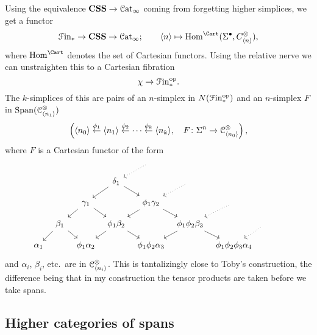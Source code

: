 \documentclass[main.tex]{subfiles}
\begin{document}
Using the equivalence $\mathbf{CSS} \to \mathcal{C}\mathrm{at}_{\infty}$ coming from forgetting higher simplices, we get a functor
\begin{equation*}
  \Finp \to \CSS \to \ICat;\qquad \langle n \rangle \mapsto \Hom^{\Cart}(\Sig^{\bullet}, C^{\otimes}_{\langle n \rangle}),
\end{equation*}
where $\Hom^{\Cart}$ denotes the set of Cartesian functors. Using the relative nerve we can unstraighten this to a Cartesian fibration
\begin{equation*}
  \chi \to \mathcal{F}\mathrm{in}_{*}^{\mathrm{op}}.
\end{equation*}
The $k$-simplices of this are pairs of an $n$-simplex in $N(\mathcal{F}\mathrm{in}_{*}^{\mathrm{op}})$ and an $n$-simplex $F$ in $\mathrm{Span}(\mathcal{C}^{\otimes}_{\langle n_{1} \rangle})$
\begin{equation*}
  \left(\langle n_{0} \rangle \overset{\phi_{1}}{\leftarrow} \langle n_{1} \rangle \overset{\phi_{2}}{\leftarrow} \cdots \overset{\phi_{k}}{\leftarrow} \langle n_{k} \rangle,\quad F\colon \Sigma^{n} \to \mathcal{C}^{\otimes}_{\langle n_{0} \rangle}\right),
\end{equation*}
where $F$ is a Cartesian functor of the form
\begin{equation*}
  \begin{tikzcd}[row sep=small, column sep=tiny]
    &&&& \
    \arrow[dl, dotted]
    \\
    &&& \delta_{1}
    \arrow[dl]
    \arrow[dr]
    && \
    \arrow[dl, dotted]
    \\
    && \gamma_{1}
    \arrow[dl]
    \arrow[dr]
    && \phi_{1}\gamma_{2}
    \arrow[dl]
    \arrow[dr]
    && \
    \arrow[dl, dotted]
    \\
    & \beta_{1}
    \arrow[dl]
    \arrow[dr]
    && \phi_{1}\beta_{2}
    \arrow[dl]
    \arrow[dr]
    && \phi_{1}\phi_{2}\beta_{3}
    \arrow[dl]
    \arrow[dr]
    && \
    \arrow[dl, dotted]
    \\
    \alpha_{1}
    && \phi_{1}\alpha_{2}
    && \phi_{1}\phi_{2} \alpha_{3}
    && \phi_{1}\phi_{2}\phi_{3} \alpha_{4}
    && \
  \end{tikzcd}
\end{equation*}
and $\alpha_{i}$, $\beta_{i}$, etc.\ are in $\mathcal{C}^{\otimes}_{\langle n_{i} \rangle}$. This is tantalizingly close to Toby's construction, the difference being that in my construction the tensor products are taken before we take spans.

\subsection{Higher categories of spans}
\label{ssc:higher_categories_of_spans}
\end{document}
